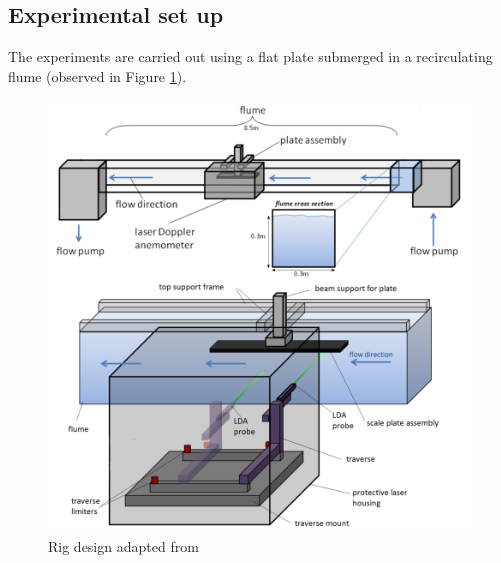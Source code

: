 \documentclass[12pt,oneside,a4paper]{article}
\begin{document}
\subsection{Experimental set up}
The experiments are carried out using a flat plate submerged in a recirculating flume (observed in Figure \ref{figure:experiments:setUp}).
%
\begin{figure}[!b]
\centering
\includegraphics[width = 12cm]{images/LDA_theoryImages/expSetUp.png}
\caption{Rig design adapted from \cite{fletcher2014phd}}
\label{figure:experiments:setUp}
\end{figure}
%
\end{document}
